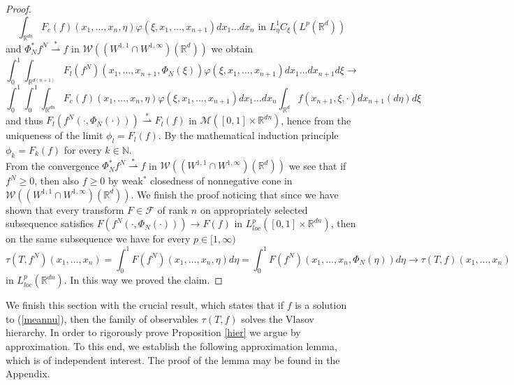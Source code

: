 \documentclass[10pt]{article}
\newcommand{\m}[1]{\mbox{#1}}
\newcommand{\vf}{\varphi}
\newcommand{\R}{\mathbb{R}}
\newcommand{\izj}{\int_{0}^{1}}
\newcommand{\ird}{\int_{\mathbb{R}^d}}
\newcommand{\W}{\mathcal{W}}
\begin{document}
\begin{proof}
\[\]
\[
\int_{\R^{dn}}F_c(f)(x_1,\dots,x_{n},\eta)\vf(\xi,x_1,\dots,x_{n+1})  dx_1\dots dx_{n} \m{ in } L^1_\eta C_\xi(L^{p}(\R^d)) 
\]
and $\Phi_N^*f^N \overset{*}{\rightharpoonup} f$ in $\W((W^{1,1}\cap W^{1,\infty})(\R^d))$ we obtain
\[
\izj \int_{\R^{d(n+1)}} F_l(f^N)(x_1,\dots,x_{n+1},\Phi_N(\xi))\vf(\xi,x_1,\dots,x_{n+1})   dx_1 \dots dx_{n+1} d\xi \rightarrow 
\]
\[
\izj \izj  \int_{\R^{dn}}F_c(f)(x_1,\dots,x_{n},\eta)\vf(\xi,x_1,\dots,x_{n+1})  dx_1\dots dx_{n}  \ird  f(x_{n+1},\xi,\cdot) dx_{n+1}(d\eta) d\xi
\]
and thus $F_l(f^N(\cdot,\Phi_N(\cdot)))\overset{*}{\rightharpoonup} F_l(f)$ in $\mathcal{M}([0,1]\times \R^{dn})$, hence from the uniqueness of the limit $\phi_l = F_l(f)$. By the mathematical induction principle $\phi_k = F_k(f)$ for every $k \in \mathbb{N}$. \\ 
From the convergence $\Phi_N^{*}f^N \overset{*}{\rightharpoonup} f$ in $\W((W^{1,1}\cap W^{1,\infty})(\R^d))$ we see that if $f^N \geq 0$, then also $f \geq 0$ by weak$^*$ closedness of nonnegative cone in $\W((W^{1,1}\cap W^{1,\infty})(\R^d))$. 
We finish the proof noticing that since we have shown that  every transform $F \in \mathcal{F}$ of rank $n$ on appropriately selected subsequence satisfies $F(f^N(\cdot,\Phi_N(\cdot))) \rightarrow F(f) $ in $L^{p}_{loc}([0,1]\times \R^{dn})$, then on the same subsequence we have for every $p \in [1,\infty)$
\[
\tau(T,f^N)(x_1,\dots,x_n) = \izj F(f^{N})(x_1,\dots,x_n,\eta)d\eta = \izj F(f^{N})(x_1,\dots,x_n,\Phi_N(\eta))d\eta \rightarrow \tau(T,f)(x_1,\dots,x_n) 
\]
 in  $L^{p}_{loc}(\R^{dn})$. In this way we proved the claim.  
\end{proof}

We finish this section with the crucial result, which states that if $f$ is a solution to (\ref{meannu}), then the family of observables $\tau(T,f)$ solves the Vlasov hierarchy. In order to rigorously prove Proposition \ref{hier} we argue by approximation. To this end, we  establish the following approximation lemma, which is of independent interest. The proof of the lemma may be found in the Appendix.
\end{document}
